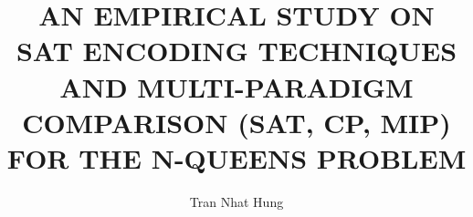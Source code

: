 \documentclass[a4paper,fleqn]{cas-sc}
\begin{document}
\let\WriteBookmarks\relax
\renewcommand{\topfraction}{.9}
\renewcommand{\bottomfraction}{.8}
\renewcommand{\textfraction}{.1}
\renewcommand{\floatpagefraction}{.75}


\title [mode = title]{AN EMPIRICAL STUDY ON SAT ENCODING TECHNIQUES AND MULTI-PARADIGM COMPARISON (SAT, CP, MIP) FOR THE N-QUEENS PROBLEM}

\author{Tran Nhat Hung}

\address{Faculty of Information Technology, VNU University of Engineering and Technology, 144 Xuan Thuy, Cau Giay, Hanoi, Vietnam}

\end{document}
